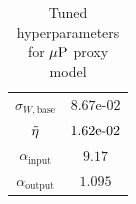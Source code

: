 \begin{table}
    \centering
    \caption{Tuned hyperparameters for $\mbox{$\mu$P}$ proxy model\label{tab:mup_hps}}
    \begin{tabular}{cc}
         \toprule
         $\sigma_{W,\text{base}}$& $8.67$e-$02$ \\
         $\tilde{\eta}$& $1.62\mbox{e-}02$\\
         $\alpha_{\text{input}}$& $9.17$\\
         $\alpha_{\text{output}}$& $1.095$\\
         \bottomrule
    \end{tabular}
\end{table}
